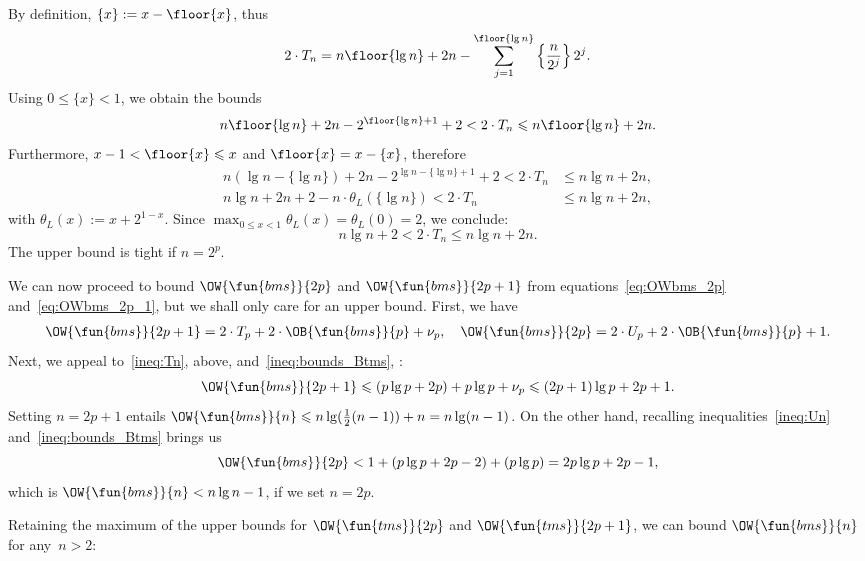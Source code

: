 \noindent By definition, \(\{x\} := x - \floor{x}\), thus
\begin{equation*}
2 \cdot T_n = n\floor{\lg n} + 2n - \sum_{j=1}^{\floor{\lg
    n}}\left\lbrace\frac{n}{2^j}\right\rbrace 2^j.
\end{equation*}
Using \(0 \leqslant \{x\} < 1\), we obtain the bounds
\begin{equation*}
n\floor{\lg n} + 2n - 2^{\floor{\lg n}+1} + 2 < 2 \cdot T_n \leqslant
n\floor{\lg n} + 2n.
\end{equation*}
Furthermore, \(x - 1 < \floor{x} \leqslant x\) and \(\floor{x} = x -
\{x\}\), therefore
\begin{align*}
n(\lg n - \{\lg n\}) + 2n - 2^{\lg n - \{\lg n\} +
  1} + 2 < 2 \cdot T_n &\leqslant n\lg n + 2n,\\
n\lg n + 2n + 2 - n \cdot \theta_L(\{\lg n\}) < 2 \cdot T_n 
&\leqslant n\lg n + 2n,
\end{align*}
with \(\theta_L(x) := x + 2^{1 - x}\). Since \(\max_{0 \leqslant x <
  1}\theta_L(x) = \theta_L(0) = 2\), we conclude:
\begin{equation}
n\lg n + 2 < 2 \cdot T_n \leqslant n\lg n + 2n.
\label{ineq:Tn}
\end{equation}
The upper bound is tight if \(n=2^p\).

We can now proceed to bound
\(\OW{\fun{bms}}{2p}\) and
\(\OW{\fun{bms}}{2p+1}\) from equations~\eqref{eq:OWbms_2p}
and~\eqref{eq:OWbms_2p_1}, but we shall only care for an upper
bound. First, we have
\begin{align*}
\OW{\fun{bms}}{2p+1} = 2 \cdot T_p + 2 \cdot \OB{\fun{bms}}{p} +
\nu_p,
\quad
\OW{\fun{bms}}{2p} = 2 \cdot U_p + 2 \cdot \OB{\fun{bms}}{p} + 1.
\end{align*}
Next, we appeal to~\eqref{ineq:Tn}, above,
and~\eqref{ineq:bounds_Btms}, :
\begin{equation*}
\OW{\fun{bms}}{2p+1}
  \leqslant (p\lg p + 2p) + p\lg p + \nu_p
   \leqslant (2p+1)\lg p + 2p + 1.
\end{equation*}
Setting \(n=2p+1\) entails \(\OW{\fun{bms}}{n} \leqslant
n\lg(\tfrac{1}{2}(n-1)) + n = n\lg(n-1)\). On the other hand,
recalling inequalities~\eqref{ineq:Un} and~\eqref{ineq:bounds_Btms}
brings us
\begin{equation*}
\OW{\fun{bms}}{2p} < 1 + (p\lg p + 2p - 2) + (p\lg p)
             = 2p\lg p + 2p - 1,
\end{equation*}
which is \(\OW{\fun{bms}}{n} < n\lg n - 1\), if we set \(n = 2p\).

Retaining the maximum of the upper bounds for
\(\OW{\fun{tms}}{2p}\) and \(\OW{\fun{tms}}{2p+1}\), we can bound
\(\OW{\fun{bms}}{n}\) for any~\(n > 2\):
